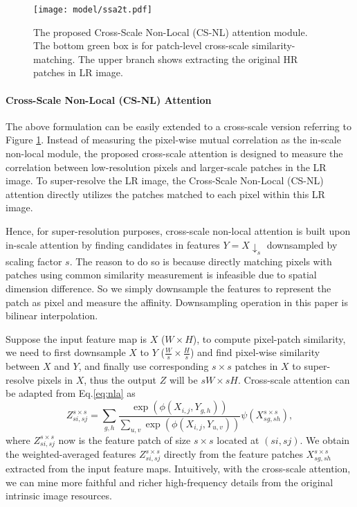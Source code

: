 \documentclass[10pt,twocolumn,letterpaper]{article}
\begin{document}
\begin{figure}[t]
	\centering
		\texttt{[image: model/ssa2t.pdf]}
	\caption{The proposed Cross-Scale Non-Local (CS-NL) attention module. The bottom green box is for patch-level cross-scale similarity-matching. The upper branch shows extracting the original HR patches in LR image. }
	\label{fig:attention}
\end{figure}

\paragraph{Cross-Scale Non-Local (CS-NL) Attention}



The above formulation can be easily extended to a cross-scale version referring to Figure \ref{fig:attention}. Instead of measuring the pixel-wise mutual correlation as the in-scale non-local module, the proposed cross-scale attention is designed to measure the correlation between low-resolution pixels and larger-scale patches in the LR image. To super-resolve the LR image, the Cross-Scale Non-Local (CS-NL) attention directly utilizes the patches matched to each pixel within this LR image.  







Hence, for super-resolution purposes, cross-scale non-local attention is built upon in-scale attention by finding candidates in features $Y= X\downarrow_s$ downsampled by scaling factor $s$. The reason to do so is because directly matching pixels with patches using common similarity measurement is infeasible due to spatial dimension difference. So we simply downsample the features to represent the patch as pixel and measure the affinity. Downsampling operation in this paper is bilinear interpolation.

Suppose the input feature map is $X$ ($W \times H$), to compute pixel-patch similarity, we need to first downsample $X$ to $Y$ ($\frac{W}{s} \times \frac{H}{s}$) and find pixel-wise similarity between $X$ and $Y$, and finally use corresponding $s \times s$ patches in $X$ to super-resolve pixels in $X$, thus the output $Z$ will be $sW \times sH$.
Cross-scale attention can be adapted from Eq.\ref{eq:nla} as
\begin{equation}
Z_{si, sj}^{s \times s} = \sum_{g, h}
\frac{\exp({\phi(X_{i, j}, Y_{g, h})})}{\sum_{u, v}\exp{(\phi(X_{i, j}, Y_{u, v}))}}
\psi(X_{sg, sh}^{s \times s}),
\label{eq:csa1}
\end{equation}
where $Z_{si, sj}^{s \times s}$ now is the feature patch of size $s \times s$ located at $(si, sj)$. We obtain the weighted-averaged features $Z_{si, sj}^{s \times s}$ directly from the feature patches $X_{sg, sh}^{s \times s}$ extracted from the input feature maps. Intuitively, with the cross-scale attention, we can mine more faithful and richer high-frequency details from the original intrinsic image resources.
\end{document}
